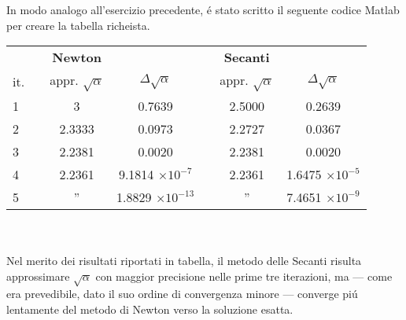 \begin{center}
\footnotesize\noindent{}\end{center}

\noindent In modo analogo all'esercizio precedente, \'e stato scritto il seguente codice Matlab per creare la tabella richeista.
\\



\begin{tabular}{l*{6}{c}}
 & \vline& \textbf{Newton} & & \vline& \textbf{Secanti}\\
 it. & \vline& appr. \(\sqrt\alpha \) & \(\Delta\sqrt\alpha \) & \vline& appr. \(\sqrt\alpha \) & \(\Delta\sqrt\alpha \) \\
\hline
 1 & \vline& 3      & 0.7639				& \vline& 2.5000 & 0.2639 \\
 2 & \vline& 2.3333 & 0.0973				& \vline& 2.2727 & 0.0367 \\
 3 & \vline& 2.2381 & 0.0020				& \vline& 2.2381 & 0.0020 \\
 4 & \vline& 2.2361 & 9.1814 \(\times10^{-7}\) 	& \vline& 2.2361 & 1.6475 \(\times10^{-5}\) \\
 5 & \vline& ''     & 1.8829 \(\times10^{-13}\)	& \vline& ''     & 7.4651 \(\times10^{-9}\) \\

\end{tabular} \\
\\

\noindent Nel merito dei risultati riportati in tabella, il metodo delle Secanti risulta approssimare \(\sqrt\alpha \) con maggior precisione nelle prime tre iterazioni, ma --- come era prevedibile, dato il suo ordine di convergenza minore --- converge pi\'u lentamente del metodo di Newton verso la soluzione esatta.
